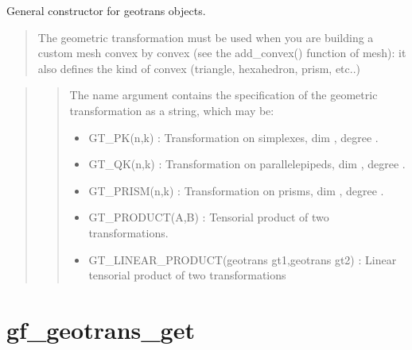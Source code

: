 \documentclass[a4paper,11pt,english]{sphinxmanual}
\begin{document}
\begin{sphinxVerbatim}[commandchars=\\\{\}]
   
\end{sphinxVerbatim}

\sphinxAtStartPar
{}

\sphinxAtStartPar
General constructor for geotrans objects.
\begin{quote}

\sphinxAtStartPar
The geometric transformation must be used when you are building a custom
mesh convex by convex (see the add\_convex() function of mesh): it also
defines the kind of convex (triangle, hexahedron, prism, etc..)
\end{quote}

\sphinxAtStartPar
{}
\begin{quote}

\sphinxAtStartPar
{}
\begin{quote}

\sphinxAtStartPar
The name argument contains the specification of the geometric transformation
as a string, which may be:
\begin{itemize}
\item {} 
\sphinxAtStartPar
GT\_PK(n,k) :
Transformation on simplexes, dim , degree .

\item {} 
\sphinxAtStartPar
GT\_QK(n,k) :
Transformation on parallelepipeds, dim , degree .

\item {} 
\sphinxAtStartPar
GT\_PRISM(n,k) :
Transformation on prisms, dim , degree .

\item {} 
\sphinxAtStartPar
GT\_PRODUCT(A,B) :
Tensorial product of two transformations.

\item {} 
\sphinxAtStartPar
GT\_LINEAR\_PRODUCT(geotrans gt1,geotrans gt2) :
Linear tensorial product of two transformations

\end{itemize}
\end{quote}
\end{quote}


\section{gf\_geotrans\_get}
\label{\detokenize{matlab_octave/cmdref_gf_geotrans_get:gf-geotrans-get}}\label{\detokenize{matlab_octave/cmdref_gf_geotrans_get::doc}}
\sphinxAtStartPar
{}
\end{document}
